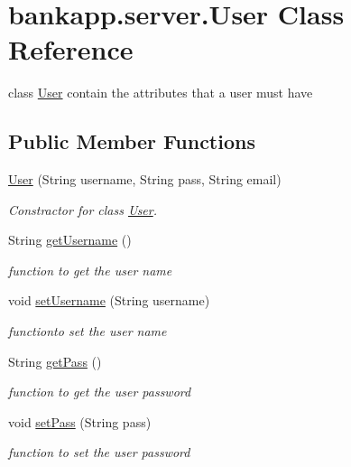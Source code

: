 \hypertarget{classbankapp_1_1server_1_1User}{}\section{bankapp.\+server.\+User Class Reference}
\label{classbankapp_1_1server_1_1User}


class \hyperlink{classbankapp_1_1server_1_1User}{User} contain the attributes that a user must have  


\subsection*{Public Member Functions}
\begin{DoxyCompactItemize}
\item 
\hyperlink{classbankapp_1_1server_1_1User_ae5d0c0c37ed136f1c3e7534a4af49105}{User} (String username, String pass, String email)
\begin{DoxyCompactList}\small\item\em Constractor for class \hyperlink{classbankapp_1_1server_1_1User}{User}. \end{DoxyCompactList}\item 
String \hyperlink{classbankapp_1_1server_1_1User_a891bc2d8c2b280f081178b65b029863c}{get\+Username} ()
\begin{DoxyCompactList}\small\item\em function to get the user name \end{DoxyCompactList}\item 
void \hyperlink{classbankapp_1_1server_1_1User_a928dc59410a7254dc30e433c39cf31bd}{set\+Username} (String username)
\begin{DoxyCompactList}\small\item\em functionto set the user name \end{DoxyCompactList}\item 
String \hyperlink{classbankapp_1_1server_1_1User_ac0743fe168b925a6c422586a94741cb9}{get\+Pass} ()
\begin{DoxyCompactList}\small\item\em function to get the user password \end{DoxyCompactList}\item 
void \hyperlink{classbankapp_1_1server_1_1User_a3456b274c14301835b2727b0355fbdb2}{set\+Pass} (String pass)
\begin{DoxyCompactList}\small\item\em function to set the user password \end{DoxyCompactList}\item 

\end{DoxyCompactItemize}

